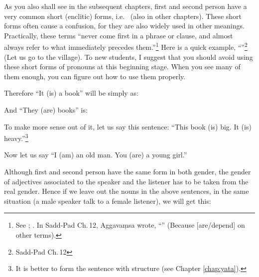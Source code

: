 \label{par:enclitic}As you also shall see in the subsequent chapters, first and second person have a very common short (enclitic) forms, i.e.\  (also  in other chapters). These short forms often cause a confusion, for they are also widely used in other meanings. Practically, these terms ``never come first in a phrase or clause, and almost always refer to what immediately precedes them.''\footnote{See \citealp[p.~64]{collins:grammar}; \citealp[see also][p.~41]{warder:intro}. In Sadd-Pad Ch.\,12, Aggava\d msa wrote, ``'' (Because  [are/depend] on other terms).} Here is a quick example, ``''\footnote{Sadd-Pad Ch.\,12} (Let us go to the village). To new students, I suggest that you should avoid using these short forms of pronouns at this beginning stage. When you see many of them enough, you can figure out how to use them properly.

Therefore ``It (is) a book'' will be simply as:


And ``They (are) books'' is:


To make more sense out of it, let us say this sentence: ``This book (is) big. It (is) heavy.''\footnote{It is better to form the sentence with  structure (see Chapter \ref{chap:yata}).}


Now let us say ``I (am) an old man. You (are) a young girl.''


Although first and second person have the same form in both gender, the gender of adjectives associated to the speaker and the listener has to be taken from the real gender. Hence if we leave out the nouns in the above sentences, in the same situation (a male speaker talk to a female listener), we will get this:


